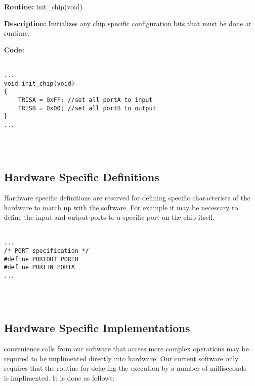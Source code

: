 \textbf{Routine:} init\_chip(void)

\textbf{Description:} Initializes any chip specific configuration bits that must be done at runtime.

\textbf{Code:}
\\
\\
\begin{minipage}{\textwidth}
\begin{lstlisting}[frame=single]
...
void init_chip(void)
{	
	TRISA = 0xFF; //set all portA to input
	TRISB = 0x00; //set all portB to output
}
...
\end{lstlisting}
\end{minipage}
\\
\\
\subsection{Hardware Specific Definitions}

Hardware specific definitions are reserved for defining specific characterists of the hardware to match up with the software. For example it may be necessary to define the input and output ports to a specific port on the chip itself.
\\
\\
\begin{minipage}{\textwidth}
\begin{lstlisting}[frame=single]
...
/* PORT specification */
#define PORTOUT PORTB
#define PORTIN PORTA
...
\end{lstlisting}
\end{minipage}
\\
\\
\subsection{Hardware Specific Implementations}

convenience calls from our software that access more complex operations may be required to be implimented directly into hardware. Our current software only requires that the routine for delaying the execution by a number of milliseconds is implimented. It is done as follows:

